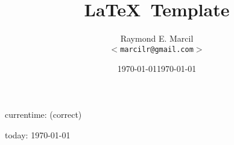 \documentclass[12pt,letterpaper,dvips]{article}
\title{\LaTeX\ Template}
\author{Raymond E. Marcil\\
        \texttt{$<$marcilr@gmail.com$>$}
}
\newcommand{\hard}[1]{\unskip\hspace{#1}\ignorespaces}
\begin{document}
\date{\today\hard{0.3em}\currenttime}

\maketitle

\date{\today}




currentime: \currenttime \hspace{1cm} (correct)





today: \today


\end{document}
